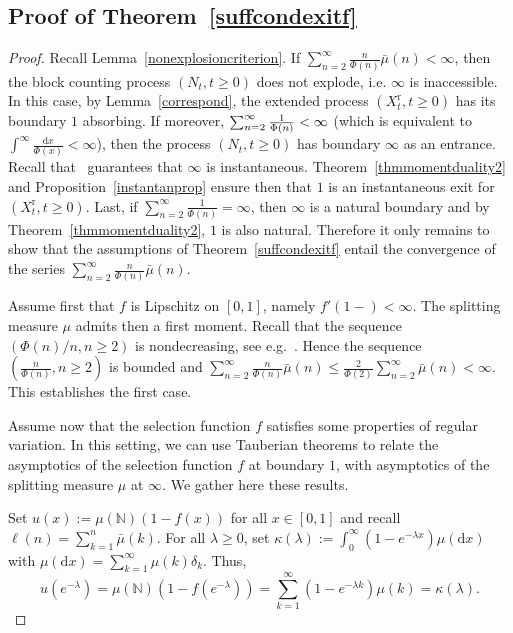 \documentclass[AHL,Unicode,longabstracts,published]{cedram}
\newcommand{\ddr}{\mathrm{d}}
\newcommand{\rmr}{\mathrm{r}}
\newcommand{\bbN}{\mathbb{N}}
\begin{document}
\subsection{Proof of Theorem~\ref{suffcondexitf}} 

\begin{proof}
Recall Lemma~\ref{nonexplosioncriterion}. If $\sum_{n=2}^{\infty}\frac{n}{\Phi(n)}\bar{\mu}(n)<\infty$, then the block counting process $(N_t,t\geq 0)$ does not explode, i.e. $\infty$ is inaccessible. In this case, by Lemma~\ref{correspond}, the extended process $(X_t^{\rmr},t\geq 0)$ has its boundary $1$ absorbing. If moreover, $\sum_{n=2}^{\infty}\frac{1}{\Phi(n)}\linebreak<\infty$ (which is equivalent to $\int^{\infty}\frac{\ddr x}{\Phi(x)}<\infty$), then the process $(N_t,t\geq 0)$ has boundary $\infty$ as an entrance. Recall that~\cite[Lemma~2.5]{cdiEFC} guarantees that $\infty$ is instantaneous. Theorem~\ref{thmmomentduality2} and Proposition~\ref{instantanprop} ensure then that $1$ is an instantaneous exit for $(X_t^{\rmr},t\geq 0)$. Last, if $\sum_{n=2}^{\infty}\frac{1}{\Phi(n)}=\infty$, then $\infty$ is a natural boundary and by Theorem~\ref{thmmomentduality2}, $1$ is also natural. Therefore it only remains to show that the assumptions of Theorem~\ref{suffcondexitf} entail the convergence of the series $\sum_{n=2}^{\infty}\frac{n}{\Phi(n)}\bar{\mu}(n)$.

Assume first that $f$ is Lipschitz on $[0,1]$, namely $f'(1-)<\infty$. The splitting measure $\mu$ admits then a first moment. Recall that the sequence $(\Phi(n)/n, n\geq 2)$ is nondecreasing, see e.g.~\cite[Lemma~2.1-(iv)]{limic2015}. Hence the sequence $(\frac{n}{\Phi(n)},n\geq 2)$ is bounded and $\sum_{n=2}^{\infty}\frac{n}{\Phi(n)}\bar{\mu}(n)\leq \frac{2}{\Phi(2)}\sum_{n=2}^{\infty}\bar{\mu}(n)<\infty$. This establishes the first case.

Assume now that the selection function $f$ satisfies some properties of regular variation. In this setting, we can use Tauberian theorems to relate the asymptotics of the selection function $f$ at boundary $1$, with asymptotics of the splitting measure $\mu$ at $\infty$. We gather here these results.

Set $u(x):=\mu(\bbN)(1-f(x))$ for all $x\in [0,1]$ and recall $\ell(n)=\sum_{k=1}^{n}\bar{\mu}(k)$. For all $\lambda \geq 0$, set $\kappa(\lambda):=\int_{0}^{\infty}(1-e^{-\lambda x})\mu(\ddr x)$ with $\mu(\ddr x)=\sum_{k=1}^{\infty}\mu(k)\delta_k$. Thus,
\begin{equation}\label{equiv}
u(e^{-\lambda})=\mu(\bbN)\left(1-f(e^{-\lambda})\right)=\sum_{k=1}^{\infty}\left(1-e^{-\lambda k}\right)\mu(k)=\kappa(\lambda).
\end{equation}


\end{proof}
\end{document}
